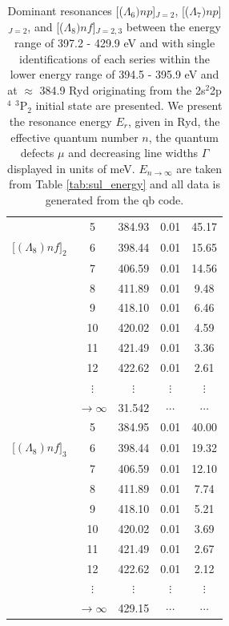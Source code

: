 \begin{table}[h]
\begin{center}
\begin{tabular}{@{} l c c c c @{}}
           \midrule
  \multicolumn{1}{c}{} & 5 & 384.93 & 0.01 & 45.17  \\        
  \multicolumn{1}{c}{[$(\Lambda_8)nf]_{2}$} & 6 & 398.44 & 0.01 & 15.65  \\
  \multicolumn{1}{c}{} & 7 & 406.59 & 0.01 & 14.56  \\
  \multicolumn{1}{c}{} & 8 & 411.89 & 0.01 & 9.48  \\
  \multicolumn{1}{c}{} & 9 & 418.10 & 0.01 & 6.46  \\
  \multicolumn{1}{c}{} & 10 & 420.02 & 0.01 & 4.59  \\
  \multicolumn{1}{c}{} & 11 & 421.49 & 0.01 & 3.36 \\
  \multicolumn{1}{c}{} & 12 & 422.62 & 0.01 & 2.61 \\
  \multicolumn{1}{c}{} & $\vdots$ & $\vdots$ & $\vdots$ & $\vdots$ \\
  \multicolumn{1}{c}{} & $\rightarrow \infty$ & 31.542 & $\cdots$ & $\cdots$ \\
                        \midrule
            \multicolumn{1}{c}{} &  5 & 384.95 & 0.01 & 40.00 \\        
  \multicolumn{1}{c}{[$(\Lambda_8)nf]_{3}$} & 6 & 398.44 & 0.01 & 19.32 \\
  \multicolumn{1}{c}{}  & 7 & 406.59 & 0.01 & 12.10 \\
  \multicolumn{1}{c}{}  & 8 & 411.89 & 0.01 & 7.74 \\
  \multicolumn{1}{c}{} & 9 & 418.10 & 0.01 & 5.21 \\
  \multicolumn{1}{c}{}  & 10 & 420.02 & 0.01 & 3.69 \\
  \multicolumn{1}{c}{}   & 11 & 421.49 & 0.01 & 2.67 \\
  \multicolumn{1}{c}{}   & 12 & 422.62 & 0.01 & 2.12 \\
  \multicolumn{1}{c}{} & $\vdots$ & $\vdots$ & $\vdots$ & $\vdots$ \\
  \multicolumn{1}{c}{} & $\rightarrow \infty$ & 429.15 & $\cdots$ & $\cdots$ \\
                                                   \bottomrule
 \end{tabular}
 \caption{Dominant resonances [($\Lambda_6)np$]$_{J=2}$, [($\Lambda_7)np$]$_{J=2}$, and [($\Lambda_8)nf$]$_{J=2,3}$ between the energy range of 397.2 - 429.9 eV and with single identifications of each series within the lower energy range of 394.5 - 395.9 eV and at $\approx$ 384.9 Ryd originating from the 2s$^2$2p$^4$ $^3$P$_2$ initial state are presented. We present the resonance energy $E_r$, given in Ryd, the effective quantum number $n$, the quantum defects $\mu$ and decreasing line widths $\Gamma$ displayed in units of meV. $E_{n\rightarrow \infty}$ are taken from Table \ref{tab:sul_energy} and all data is generated from the {\sc qb} code. \label{tab:sul_res2}}
 \end{center}
\end{table}




